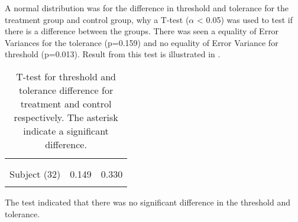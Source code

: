 A normal distribution was for the difference in threshold and tolerance for the treatment group and control group, why a T-test ($\alpha$ < 0.05) was used to test  if there is a difference between the groups. 
There was seen a equality of Error Variances for the tolerance (p=0.159) and no equality of Error Variance for threshold (p=0.013).
Result from this test is illustrated in .

\begin{longtable} {l|c|c}
 \rowcolor[HTML]{C0C0C0} 
  \color[HTML]{000000}{} & 
 \multicolumn{1}{c|}{ \color[HTML]{000000}{\textbf{Threshold}}} & \multicolumn{1}{c}{ \color[HTML]{000000}{\textbf{Tolerance}}}  	\\  \rule{0pt}{3ex} 
  \cellcolor[HTML]{C0C0C0}{} &
 \multicolumn{1}{c|}{ \cellcolor[HTML]{C0C0C0}{Difference }} & \multicolumn{1}{|c}{ \cellcolor[HTML]{C0C0C0}{Difference}}  	\\ \hline
Subject (32) & 0.149 & 0.330  \\ \hline
	\caption{T-test for threshold and tolerance difference for treatment and control respectively. The asterisk indicate a significant difference.}	\label{tab:T-test1}
\end{longtable}
\vspace{-.5cm}

The test indicated that there was no significant difference in the threshold and tolerance.

